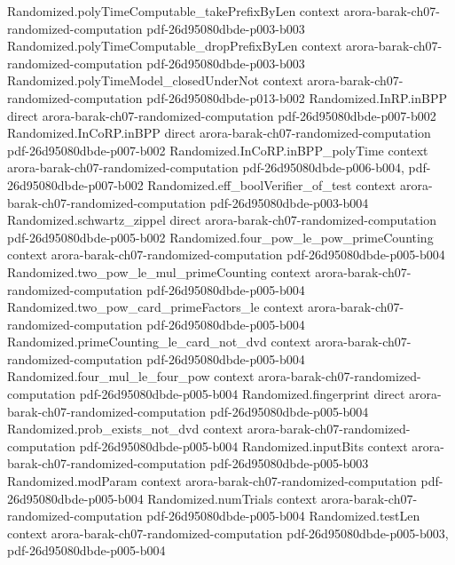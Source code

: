 \begin{theorem}
  {Randomized.polyTimeComputable_takePrefixByLen}
  {context}
  {arora-barak-ch07-randomized-computation}
  {pdf-26d95080dbde-p003-b003}
\proofstep
  {Randomized.polyTimeComputable_dropPrefixByLen}
  {context}
  {arora-barak-ch07-randomized-computation}
  {pdf-26d95080dbde-p003-b003}
\proofstep
  {Randomized.polyTimeModel_closedUnderNot}
  {context}
  {arora-barak-ch07-randomized-computation}
  {pdf-26d95080dbde-p013-b002}
\proofstep
  {Randomized.InRP.inBPP}
  {direct}
  {arora-barak-ch07-randomized-computation}
  {pdf-26d95080dbde-p007-b002}
\proofstep
  {Randomized.InCoRP.inBPP}
  {direct}
  {arora-barak-ch07-randomized-computation}
  {pdf-26d95080dbde-p007-b002}
\proofstep
  {Randomized.InCoRP.inBPP_polyTime}
  {context}
  {arora-barak-ch07-randomized-computation}
  {pdf-26d95080dbde-p006-b004,
    pdf-26d95080dbde-p007-b002}
\proofstep
  {Randomized.eff_boolVerifier_of_test}
  {context}
  {arora-barak-ch07-randomized-computation}
  {pdf-26d95080dbde-p003-b004}
\proofstep
  {Randomized.schwartz_zippel}
  {direct}
  {arora-barak-ch07-randomized-computation}
  {pdf-26d95080dbde-p005-b002}
\proofstep
  {Randomized.four_pow_le_pow_primeCounting}
  {context}
  {arora-barak-ch07-randomized-computation}
  {pdf-26d95080dbde-p005-b004}
\proofstep
  {Randomized.two_pow_le_mul_primeCounting}
  {context}
  {arora-barak-ch07-randomized-computation}
  {pdf-26d95080dbde-p005-b004}
\proofstep
  {Randomized.two_pow_card_primeFactors_le}
  {context}
  {arora-barak-ch07-randomized-computation}
  {pdf-26d95080dbde-p005-b004}
\proofstep
  {Randomized.primeCounting_le_card_not_dvd}
  {context}
  {arora-barak-ch07-randomized-computation}
  {pdf-26d95080dbde-p005-b004}
\proofstep
  {Randomized.four_mul_le_four_pow}
  {context}
  {arora-barak-ch07-randomized-computation}
  {pdf-26d95080dbde-p005-b004}
\proofstep
  {Randomized.fingerprint}
  {direct}
  {arora-barak-ch07-randomized-computation}
  {pdf-26d95080dbde-p005-b004}
\proofstep
  {Randomized.prob_exists_not_dvd}
  {context}
  {arora-barak-ch07-randomized-computation}
  {pdf-26d95080dbde-p005-b004}
\proofstep
  {Randomized.inputBits}
  {context}
  {arora-barak-ch07-randomized-computation}
  {pdf-26d95080dbde-p005-b003}
\proofstep
  {Randomized.modParam}
  {context}
  {arora-barak-ch07-randomized-computation}
  {pdf-26d95080dbde-p005-b004}
\proofstep
  {Randomized.numTrials}
  {context}
  {arora-barak-ch07-randomized-computation}
  {pdf-26d95080dbde-p005-b004}
\proofstep
  {Randomized.testLen}
  {context}
  {arora-barak-ch07-randomized-computation}
  {pdf-26d95080dbde-p005-b003,
    pdf-26d95080dbde-p005-b004}
\proofstep

\end{theorem}
